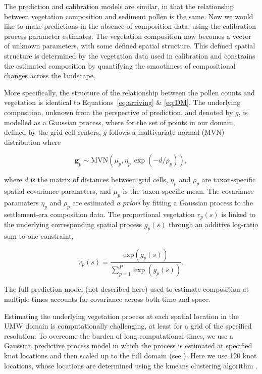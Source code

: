 \documentclass[12pt]{article}
\begin{document}
The prediction and calibration models are similar, in that the
relationship between vegetation composition and sediment pollen is the
same. Now we would like to make predictions in the absence of
composition data, using the calibration process parameter
estimates. The vegetation composition now becomes a vector of unknown
parameters, with some defined spatial structure. This defined spatial
structure is determined by the vegetation data used in calibration and
constrains the estimated composition by quantifying the smoothness of
compositional changes across the landscape.

More specifically, the structure of the relationship between the
pollen counts and vegetation is identical to
Equations~\ref{eq:arriving} \& \ref{eq:DM}. The underlying
composition, unknown from the perspective of prediction, and denoted
by $g$, is modelled as a Gaussian process, where for the set of points
in our domain, defined by the grid cell centers, $g$ follows a
multivariate normal (MVN) distribution where
\begin{linenomath*}
\begin{equation*}
\bm{g}_p \sim \text{MVN}(\mu_p, \eta_p \, \exp(-d/\rho_p)),
\end{equation*}
\end{linenomath*}
where $d$ is the matrix of distances between grid cells, $\eta_p$ and
$\rho_p$ are taxon-specific spatial covariance parameters, and $\mu_p$
is the taxon-specific mean.  The covariance paramaters $\eta_p$ and
$\rho_p$ are estimated \textit{a priori} by fitting a Gaussian process
to the settlement-era composition data.  The proportional vegetation
$r_p(s)$ is linked to the underlying corresponding spatial process
$g_p(s)$ through an additive log-ratio sum-to-one constraint,
\begin{linenomath*}
\begin{equation*}
r_p(s) = \frac{ \text{exp}(g_p(s))}{ \sum_{p=1}^P \exp (g_p(s)) }.
\end{equation*} 
\end{linenomath*}
The full prediction model (not described here) used to estimate
composition at multiple times accounts for covariance across both time
and space. 

Estimating the underlying vegetation process at each spatial location
in the UMW domain is computationally challenging, at
least for a grid of the specified resolution. To overcome the burden
of long computational times, we use a Gaussian predictive process
model in which the process is estimated at specified knot locations
and then scaled up to the full domain (see
\citet{finley2009improving}). Here we use 120 knot locations, whose
locations are determined using the kmeans clustering algorithm
\citep{macqueen1967some}.
\end{document}
